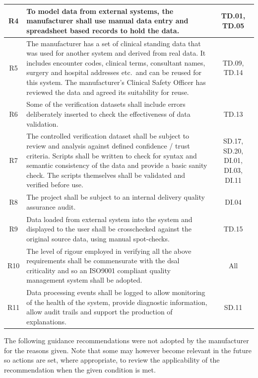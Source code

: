 \begin{longtable}{|C{}|L{}|C{}|}
  \hline
  R4 & To model data from external systems, the manufacturer shall use manual data entry and spreadsheet based records to hold the data. & TD.01, TD.05\\
  \hline
  R5 & The manufacturer has a set of clinical standing data that was used for another system and derived from real data.
  It includes encounter codes, clinical terms, consultant names, surgery and hospital addresses etc.\ and can be reused for this system. The manufacturer's Clinical Safety Officer has reviewed the data and agreed its suitability for reuse. & TD.09, TD.14\\
  \hline
  R6 & Some of the \gls{verification} \glspl{dataset} shall include errors deliberately inserted to check the effectiveness of data \gls{validation}. & TD.13\\
  \hline
  R7 & The controlled \gls{verification} \gls{dataset} shall be subject to review and analysis against defined confidence / trust criteria. Scripts shall be written to check for syntax and semantic \gls{consistency} of the data and provide a basic sanity check. The scripts themselves shall be validated and verified before use. & SD.17, SD.20, DI.01, DI.03, DI.11\\
  \hline
  R8 & The project shall be subject to an internal delivery quality assurance audit. & DI.04\\
  \hline
  R9 & Data loaded from external system into the system and displayed to the user shall be crosschecked against the original source data, using manual spot-checks. & TD.15\\
  \hline
  R10 & The level of rigour employed in verifying all the above requirements shall be commensurate with the \gls{dsal} \gls{criticality} and so an ISO9001 compliant quality management system shall be adopted. & All\\
  \hline
  R11 & Data processing events shall be logged to allow monitoring of the health of the system, provide diagnostic \gls{information}, allow audit trails and support the production of explanations. & SD.11
  \\
  \hline
\end{longtable}

The following guidance recommendations were not adopted by the manufacturer for the reasons given. Note that some may however become relevant in the future so actions are set, where appropriate, to review the applicability of the recommendation when the given condition is met.

